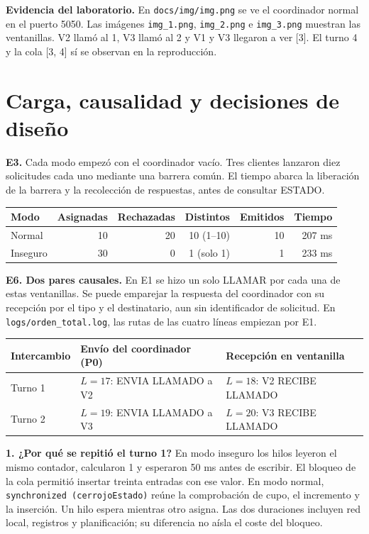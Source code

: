\documentclass[11pt,a4paper]{article}
\begin{document}
\textbf{Evidencia del laboratorio.} En \texttt{docs/img/img.png} se ve el coordinador normal en el puerto 5050. Las imágenes \texttt{img\_1.png}, \texttt{img\_2.png} e \texttt{img\_3.png} muestran las ventanillas. V2 llamó al 1, V3 llamó al 2 y V1 y V3 llegaron a ver [3]. El turno 4 y la cola [3, 4] sí se observan en la reproducción.

\newpage
\section*{Carga, causalidad y decisiones de diseño}
\textbf{E3.} Cada modo empezó con el coordinador vacío. Tres clientes lanzaron diez solicitudes cada uno mediante una barrera común. El tiempo abarca la liberación de la barrera y la recolección de respuestas, antes de consultar ESTADO.

\begin{tabularx}{\linewidth}{@{}Xrrrrr@{}}
\toprule
Modo & Asignadas & Rechazadas & Distintos & Emitidos & Tiempo\\ \midrule
Normal & 10 & 20 & 10 (1--10) & 10 & 207 ms\\
Inseguro & 30 & 0 & 1 (solo 1) & 1 & 233 ms\\
\bottomrule
\end{tabularx}

\textbf{E6. Dos pares causales.} En E1 se hizo un solo LLAMAR por cada una de estas ventanillas. Se puede emparejar la respuesta del coordinador con su recepción por el tipo y el destinatario, aun sin identificador de solicitud. En \texttt{logs/orden\_total.log}, las rutas de las cuatro líneas empiezan por E1.

\begin{tabularx}{\linewidth}{@{}lXX@{}}
\toprule
Intercambio & Envío del coordinador (P0) & Recepción en ventanilla\\ \midrule
Turno 1 & $L=17$: ENVIA LLAMADO a V2 & $L=18$: V2 RECIBE LLAMADO\\
Turno 2 & $L=19$: ENVIA LLAMADO a V3 & $L=20$: V3 RECIBE LLAMADO\\
\bottomrule
\end{tabularx}

\textbf{1. ¿Por qué se repitió el turno 1?} En modo inseguro los hilos leyeron el mismo contador, calcularon 1 y esperaron 50 ms antes de escribir. El bloqueo de la cola permitió insertar treinta entradas con ese valor. En modo normal, \texttt{synchronized (cerrojoEstado)} reúne la comprobación de cupo, el incremento y la inserción. Un hilo espera mientras otro asigna. Las dos duraciones incluyen red local, registros y planificación; su diferencia no aísla el coste del bloqueo.
\end{document}
